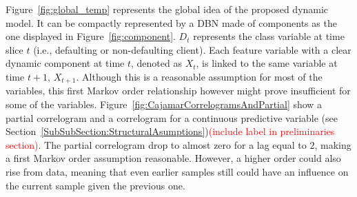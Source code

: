 
%  
%  
%  
%  
%  


Figure~\ref{fig:global_temp} represents the global idea of the proposed dynamic model. It can be compactly represented by a DBN made of components as the one displayed in 
Figure~\ref{fig:component}. $D_t$ represents the class variable at time slice $t$ (i.e., defaulting or non-defaulting client). Each feature variable with a clear dynamic component at time $t$, denoted as $X_t$, is linked to the same variable at time $t+1$, $X_{t+1}$. Although this is a reasonable assumption for most of the variables, this first Markov order relationship however might prove insufficient for some of the variables. Figure~\ref{fig:CajamarCorrelogramsAndPartial} show a partial correlogram and a correlogram for a continuous predictive variable (see Section~\ref{SubSubSection:StructuralAsumptions})\textcolor{red}{(include label in preliminaries section)}. The partial correlogram drop to almost zero for a lag equal to $2$, making a first Markov order assumption reasonable. However, a higher order could also rise from data, meaning that even earlier samples still could have an influence on the current sample given the previous one. 

